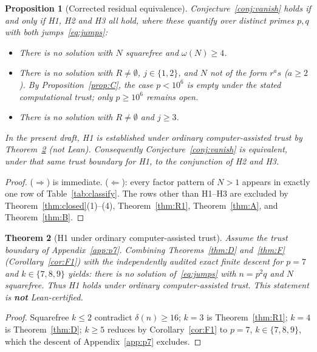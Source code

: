 \documentclass[11pt,reqno]{amsart}
\newtheorem{theorem}{Theorem}
\newtheorem{proposition}[theorem]{Proposition}
\theoremstyle{definition}
\begin{document}
\begin{proposition}[Corrected residual equivalence]
\label{prop:implies-corrected}
Conjecture~\ref{conj:vanish} holds if and only if H1, H2 and H3 all hold, where these quantify over distinct primes \(p,q\) with both jumps~\eqref{eq:jumps}:
\begin{itemize}
\item[\textbf{H1.}] There is no solution with \(N\) squarefree and \(\omega(N)\ge 4\).
\item[\textbf{H2.}] There is no solution with \(R\neq\emptyset\), \(j\in\{1,2\}\), and \(N\) not of the form \(r^as\) (\(a\ge 2\)). By Proposition~\ref{prop:C}, the case \(p<10^6\) is empty under the stated computational trust; only \(p\ge 10^6\) remains open.
\item[\textbf{H3.}] There is no solution with \(R\neq\emptyset\) and \(j\ge 3\).
\end{itemize}
In the present draft, H1 is established under ordinary computer-assisted trust by Theorem~\ref{thm:H1-comp} (not Lean). Consequently Conjecture~\ref{conj:vanish} is equivalent, under that same trust boundary for H1, to the conjunction of H2 and H3.
\end{proposition}

\begin{proof}
(\(\Rightarrow\)) is immediate. (\(\Leftarrow\)): every factor pattern of \(N>1\) appears in exactly one row of Table~\ref{tab:classify}. The rows other than H1--H3 are excluded by Theorem~\ref{thm:closed}(1)--(4), Theorem~\ref{thm:R1}, Theorem~\ref{thm:A}, and Theorem~\ref{thm:B}.
\end{proof}

\begin{theorem}[H1 under ordinary computer-assisted trust]
\label{thm:H1-comp}
Assume the trust boundary of Appendix~\ref{app:p7}. Combining Theorems~\ref{thm:D} and~\ref{thm:F} (Corollary~\ref{cor:F1}) with the independently audited exact finite descent for \(p=7\) and \(k\in\{7,8,9\}\) yields: there is no solution of~\eqref{eq:jumps} with \(n=p^2q\) and \(N\) squarefree. Thus H1 holds under ordinary computer-assisted trust. This statement is \textbf{not} Lean-certified.
\end{theorem}

\begin{proof}
Squarefree \(k\le 2\) contradict \(\delta(n)\ge 16\); \(k=3\) is Theorem~\ref{thm:R1}; \(k=4\) is Theorem~\ref{thm:D}; \(k\ge 5\) reduces by Corollary~\ref{cor:F1} to \(p=7\), \(k\in\{7,8,9\}\), which the descent of Appendix~\ref{app:p7} excludes.
\end{proof}
\end{document}
